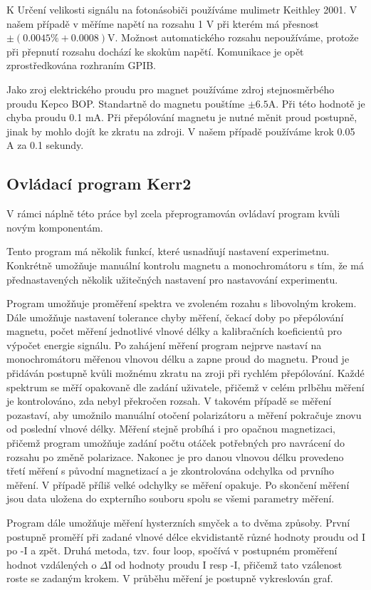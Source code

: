 K Určení velikosti signálu na fotonásobiči používáme mulimetr Keithley 2001. V našem případě v měříme napětí na rozsahu 1 V při kterém má přesnost $\pm(0.0045\%+0.0008)$V. Možnost automatického rozsahu nepoužíváme, protože při přepnutí rozsahu dochází ke skokům napětí. Komunikace je opět zprostředkována rozhraním GPIB.

Jako zroj elektrického proudu pro magnet používáme zdroj stejnosměrbého proudu Kepco BOP. Standartně do magnetu pouštíme $\pm 6.5$A. Při této hodnotě je chyba proudu 0.1 mA. Při přepólování magnetu je nutné měnit proud postupně, jinak by mohlo dojít ke zkratu na zdroji. V našem případě používáme krok 0.05 A za 0.1 sekundy.

\subsection{Ovládací program Kerr2}
V rámci náplně této práce byl zcela přeprogramován ovládaví program kvůli novým komponentám.

Tento program má několik funkcí, které usnadňují nastavení experimetnu. Konkrétně umožňuje manuální kontrolu magnetu a monochromátoru s tím, že má přednastavených několik užitečných nastavení pro nastavování experimentu.

Program umožňuje proměření spektra ve zvoleném rozahu s libovolným krokem. Dále umožňuje nastavení tolerance chyby měření, čekací doby po přepólování magnetu, počet měření jednotlivé vlnové délky a kalibračních koeficientů pro výpočet energie signálu. Po zahájení měření program nejprve nastaví na monochromátoru měřenou vlnovou délku a zapne proud do magnetu. Proud je přidáván postupně kvůli možnému zkratu na zroji při rychlém přepólování. Každé spektrum se měří opakovaně dle zadání uživatele, přičemž v celém prlběhu měření je kontrolováno, zda nebyl překročen rozsah. V takovém případě se měření pozastaví, aby umožnilo manuální otočení polarizátoru a měření pokračuje znovu od poslední vlnové délky. Měření stejně probíhá i pro opačnou magnetizaci, přičemž program umožňuje zadání počtu otáček potřebných pro navrácení do rozsahu po změně polarizace. Nakonec je pro danou vlnovou délku provedeno třetí měření s původní magnetizací a je zkontrolována odchylka od prvního měření. V případě příliš velké odchylky se měření opakuje. Po skončení měření jsou data uložena do expterního souboru spolu se všemi parametry měření.

Program dále umožňuje měření hysterzních smyček a to dvěma způsoby. První postupně proměří při zadané vlnové délce ekvidistantě různé hodnoty proudu od I po -I a zpět. Druhá metoda, tzv. four loop, spočívá v postupném proměření hodnot vzdálených o $\Delta$I od hodnoty proudu I resp -I, přičemž tato vzálenost roste se zadaným krokem. V průběhu měření je postupně vykreslován graf.
